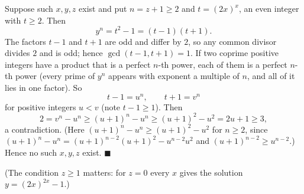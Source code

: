 Suppose such $x,y,z$ exist and put $n=z+1\ge2$ and $t=(2x)^x$, an even integer with $t\ge2$. Then
\[
y^n=t^2-1=(t-1)(t+1).
\]
The factors $t-1$ and $t+1$ are odd and differ by $2$, so any common divisor divides $2$ and is odd; hence $\gcd(t-1,t+1)=1$. If two coprime positive integers have a product that is a perfect $n$-th power, each of them is a perfect $n$-th power (every prime of $y^n$ appears with exponent a multiple of $n$, and all of it lies in one factor). So
\[
t-1=u^n,\qquad t+1=v^n
\]
for positive integers $u<v$ (note $t-1\ge1$). Then
\[
2=v^n-u^n\ge(u+1)^n-u^n\ge(u+1)^2-u^2=2u+1\ge3,
\]
a contradiction. (Here $(u+1)^n-u^n\ge(u+1)^2-u^2$ for $n\ge2$, since $(u+1)^n-u^n=(u+1)^{n-2}(u+1)^2-u^{n-2}u^2$ and $(u+1)^{n-2}\ge u^{n-2}$.) Hence no such $x,y,z$ exist. $\blacksquare$

(The condition $z\ge1$ matters: for $z=0$ every $x$ gives the solution $y=(2x)^{2x}-1$.)
